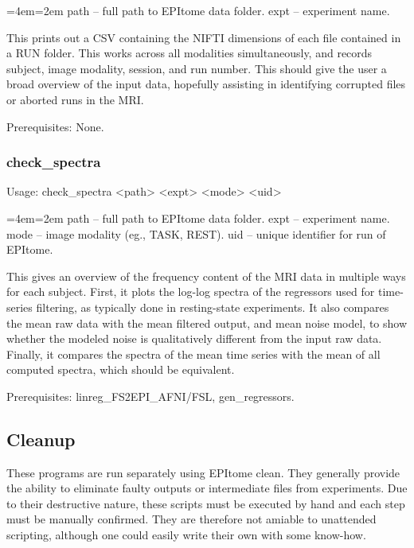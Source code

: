 \documentclass[final,titlepage,letterpaper,oneside,12pt]{article}
\renewcommand{\texttt}[2][BrickRed]{\textcolor{#1}{\ttfamily #2}}%
\newenvironment{blockquote}{%
  \par%
  \medskip
  \leftskip=4em\rightskip=2em%
  \noindent\ignorespaces}{%
  \par\medskip}
\begin{document}
\begin{blockquote}
path -- full path to EPItome data folder.
expt -- experiment name.
\end{blockquote}

\noindent This prints out a CSV containing the NIFTI dimensions of each file contained in a RUN folder. This works across all modalities simultaneously, and records subject, image modality, session, and run number. This should give the user a broad overview of the input data, hopefully assisting in identifying corrupted files or aborted runs in the MRI.

Prerequisites: None.

\subsubsection{check\_spectra}
Usage: \texttt{check\_spectra <path> <expt> <mode> <uid>}

\begin{blockquote}
path -- full path to EPItome data folder.
expt -- experiment name.
mode -- image modality (eg., TASK, REST).
uid -- unique identifier for run of EPItome.
\end{blockquote}

\noindent This gives an overview of the frequency content of the MRI data in multiple ways for each subject. First, it plots the log-log spectra of the regressors used for time-series filtering, as typically done in resting-state experiments. It also compares the mean raw data with the mean filtered output, and mean noise model, to show whether the modeled noise is qualitatively different from the input raw data. Finally, it compares the spectra of the mean time series with the mean of all computed spectra, which should be equivalent.

Prerequisites: \texttt{linreg\_FS2EPI\_AFNI/FSL, gen\_regressors}.

\subsection{Cleanup}

These programs are run separately using \texttt{EPItome clean}. They generally provide the ability to eliminate faulty outputs or intermediate files from experiments. Due to their destructive nature, these scripts must be executed by hand and each step must be manually confirmed. They are therefore not amiable to unattended scripting, although one could easily write their own with some know-how. 
\end{document}
